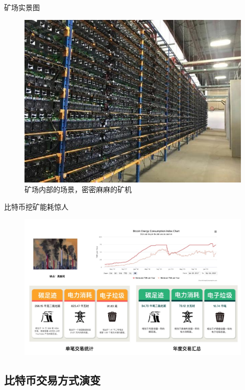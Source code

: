 \documentclass[11pt]{beamer}
\begin{document}
\begin{frame}{矿场实景图}
	\begin{figure}
	\centering
	\includegraphics[width=0.7\linewidth]{figures/miningFactory}
	\caption{矿场内部的场景，密密麻麻的矿机}
	\label{fig:miningfactory}
	\end{figure}
\end{frame}

\begin{frame}{比特币挖矿能耗惊人}
	\begin{figure}
		\centering
		\includegraphics[width=0.88\linewidth]{figures/powerWastedOfBTCjpg}
		\label{fig:powerwastedofbtcjpg}
	\end{figure}
	
\end{frame}
\subsection{比特币交易方式演变}
\end{document}

